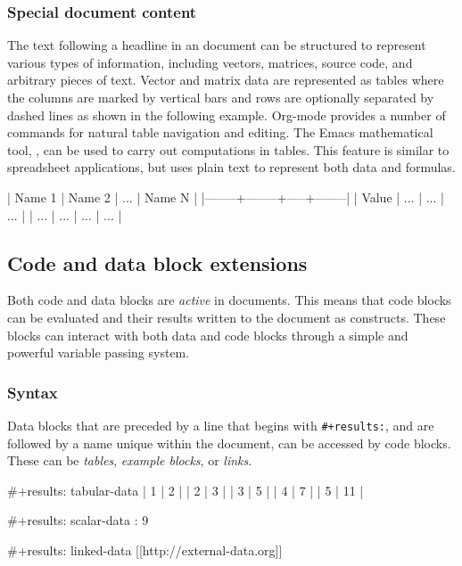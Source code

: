 \documentclass[article,shortnames]{jss}
\begin{document}
\subsubsection{Special document content}
\label{sec-3-1-3}


The text following a headline in an  document can be
structured to represent various types of information, including
vectors, matrices, source code, and arbitrary pieces of text.  Vector
and matrix data are represented as tables where the columns are marked
by vertical bars and rows are optionally separated by dashed lines as
shown in the following example.  Org-mode provides a number of
commands for natural table navigation and editing.  The Emacs
mathematical tool,  \cite{calc}, can be used to carry out
computations in tables.  This feature is similar to spreadsheet
applications, but  uses plain text to represent both data and
formulas.


\begin{Code}
| Name 1 | Name 2 | ... | Name N |
|--------+--------+-----+--------|
| Value  | ...    | ... | ...    |
| ...    | ...    | ... | ...    |
\end{Code}
\subsection{Code and data block extensions}
\label{sec-3-2}
\label{code-blocks}


Both code and data blocks are \emph{active} in  documents.  This
means that code blocks can be evaluated and their results written to
the document as  constructs.  These blocks can interact with
both data and code blocks through a simple and powerful variable
passing system.
\subsubsection{Syntax}
\label{sec-3-2-1}
\label{syntax}


Data blocks that are preceded by a line that begins with \texttt{\#+results:},
and are followed by a name unique within the document, can be accessed
by code blocks. These can be \emph{tables}, \emph{example blocks}, or \emph{links}.

\begin{Code}
#+results: tabular-data
| 1 |  2 |
| 2 |  3 |
| 3 |  5 |
| 4 |  7 |
| 5 | 11 |

#+results: scalar-data
: 9

#+results: linked-data
[[http://external-data.org]]
\end{Code}
\end{document}
